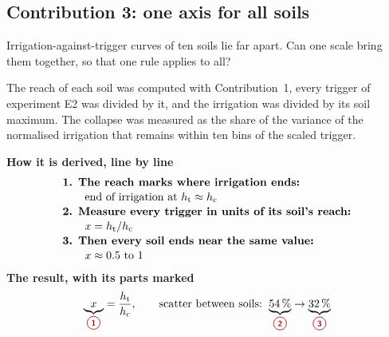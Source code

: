 \subsection{Contribution 3: one axis for all soils}\label{con:s4:3}
\begin{problem}
Irrigation-against-trigger curves of ten soils lie far apart. Can one scale bring them together, so that one rule applies to all?
\end{problem}
\begin{derivation}
The reach of each soil was computed with Contribution~1, every trigger of experiment E2 was divided by it, and the irrigation was divided by its soil maximum. The collapse was measured as the share of the variance of the normalised irrigation that remains within ten bins of the scaled trigger.
\end{derivation}
\begin{keyresult}
\begin{pencil}
{\small\noindent\textbf{How it is derived, line by line}
\[\begin{array}{@{}l@{}}\textbf{1. The reach marks where irrigation ends:}\\[1pt]
\qquad \text{end of irrigation at } \htr\approx\hc\\[1pt]
\textbf{2. Measure every trigger in units of its soil's reach:}\\[1pt]
\qquad x=\htr/\hc\\[1pt]
\textbf{3. Then every soil ends near the same value:}\\[1pt]
\qquad x\approx0.5\ \text{to}\ 1
\end{array}\]}
\noindent\textbf{The result, with its parts marked}
\[\underbrace{x}_{\circled{1}}=\frac{\htr}{\hc},\qquad \text{scatter between soils: }\underbrace{54\,\%}_{\circled{2}}\to\underbrace{32\,\%}_{\circled{3}}\]
\end{pencil}
\end{keyresult}
\begin{pins}
\end{pins}


